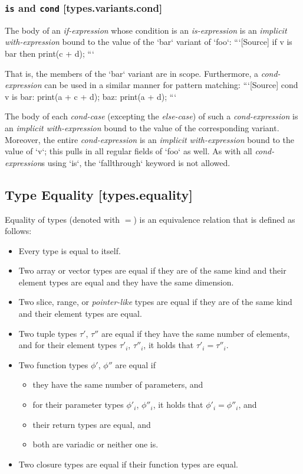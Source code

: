 \documentclass[a4paper, 12pt, oneside, final]{article}
\begin{document}
\subsubsection{\texttt{is} and \texttt{cond} [types.variants.cond]}
\noindent The body of an \emph{if-expression} whose condition is an \emph{is-expression} is an \textit{implicit with-expression}
bound to the value of the `bar` variant of `foo`:
```[Source]
if v is bar then print(c + d);
```

That is, the members of the `bar` variant are in scope. Furthermore, a \textit{cond-expression} can be used in a
similar manner for pattern matching:
```[Source]
cond v is {
    bar: print(a + c + d);
    baz: print(a + d);
}
```

The body of each \textit{cond-case} (excepting the \textit{else-case}) of such a \textit{cond-expression} is an
\emph{implicit with-expression} bound to the value of the corresponding variant. Moreover, the entire \textit{cond-expression} is
an \emph{implicit with-expression} bound to the value of `v`; this pulls in all regular fields of `foo` as well. As with
all \textit{cond-expression}s using `is`, the `fallthrough` keyword is not allowed.

\subsection{Type Equality [types.equality]}
Equality of types (denoted with $=$) is an equivalence relation that is defined as follows:
\begin{itemize}
\item Every type is equal to itself.
\item Two array or vector types are equal if they are of the same kind and their element types are equal and they have the same dimension.
\item Two slice, range, or \emph{pointer-like} types are equal if they are of the same kind and their element types are equal.
\item Two tuple types $\tau'$, $\tau''$ are equal if they have the same number of elements, and for their
      element types $\tau'_i$, $\tau''_i$, it holds that $\tau'_i = \tau''_i$.
\item Two function types $\phi'$, $\phi''$ are equal if
    \begin{itemize}
        \item they have the same number of parameters, and
        \item for their parameter types $\phi'_i$, $\phi''_i$, it holds that $\phi'_i = \phi''_i$, and
        \item their return types are equal, and
        \item both are variadic or neither one is.
    \end{itemize}
\item Two closure types are equal if their function types are equal.
\end{itemize}
\end{document}
